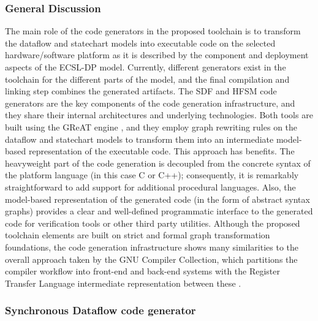 

\subsubsection* {General Discussion}

The main role of the code generators in the proposed toolchain is to transform the dataflow and statechart models into executable code
on the selected hardware/software platform as it is described by the component and deployment aspects of the ECSL-DP model. Currently, different generators exist in the toolchain for the different parts of the model, and the final compilation and linking step combines the generated artifacts. The SDF and HFSM code generators are the key components of the code generation infrastructure, and they share their internal architectures and underlying technologies. Both tools are built using the GReAT engine \cite{isis:great}, and they employ graph rewriting rules on the dataflow and statechart models to transform them into an intermediate model-based representation of the executable code.  This approach has benefits. The heavyweight part of the code generation is decoupled from the concrete syntax of the platform language (in this case C or C++); consequently, it is remarkably straightforward to add support for additional procedural languages. Also, the model-based representation of the generated code (in the form of abstract syntax graphs) provides a clear and well-defined programmatic interface to the generated code for verification tools or other third party utilities.
Although the proposed toolchain elements are built on strict and formal graph transformation foundations, the code generation infrastructure shows many similarities to the overall approach taken by the GNU Compiler Collection, which partitions the compiler workflow into front-end and back-end systems with the Register Transfer Language intermediate representation between these \cite{gcc}.

\subsubsection* {Synchronous Dataflow code generator}


